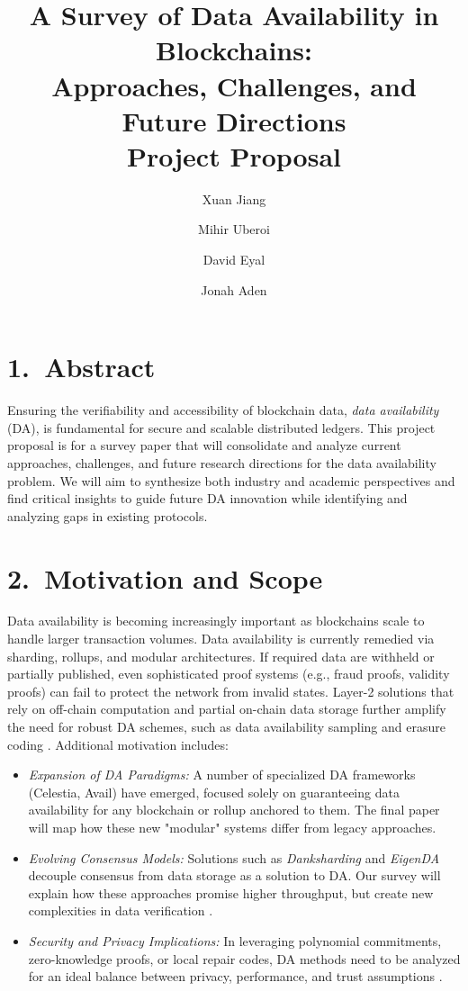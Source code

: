 \documentclass[12pt]{article}
\title{A Survey of Data Availability in Blockchains: \\ 
Approaches, Challenges, and Future Directions \\
Project Proposal}
\author{Xuan Jiang \and Mihir Uberoi \and David Eyal \and Jonah Aden }
\date{} %
\begin{document}
\vspace{-1cm}
\maketitle

\section*{1.\ Abstract}
Ensuring the verifiability and accessibility of blockchain data,
\emph{data availability} (DA), is fundamental for secure and scalable distributed ledgers. 
This project proposal is for a survey paper that will consolidate and analyze current approaches, challenges, and future research directions for the data availability problem. We will aim to synthesize both
industry and academic perspectives and find critical insights to guide future
DA innovation while identifying and analyzing gaps in existing protocols.

\section*{2.\ Motivation and Scope}
\noindent
Data availability is becoming increasingly important as blockchains scale to handle larger 
transaction volumes. Data availability is currently remedied via sharding, rollups, and modular architectures. 
If required data are withheld or partially published, even sophisticated proof systems (e.g., 
fraud proofs, validity proofs) can fail to protect the network from invalid states. Layer-2 
solutions that rely on off-chain computation and partial on-chain data storage further
amplify the need for robust DA schemes, such as data availability sampling and erasure
coding \citep{heo2024}. Additional motivation includes:
\begin{itemize}
    \item \emph{Expansion of DA Paradigms:} A number of specialized DA frameworks (Celestia, Avail) have emerged, focused solely on guaranteeing data availability for any blockchain or rollup anchored to them. The final paper will map how these new 
    "modular" systems differ from legacy approaches.
    \item \emph{Evolving Consensus Models:} Solutions such as \emph{Danksharding} and 
    \emph{EigenDA} decouple consensus from data storage as a solution to DA. 
    Our survey will explain how these approaches promise higher throughput, but create new complexities in data verification \citep{saif2024}.
    \item \emph{Security and Privacy Implications:} In leveraging polynomial 
    commitments, zero-knowledge proofs, or local repair codes, DA methods need to be analyzed for an ideal balance between privacy, performance, and trust assumptions \citep{liux2023}.
\end{itemize}
\end{document}
